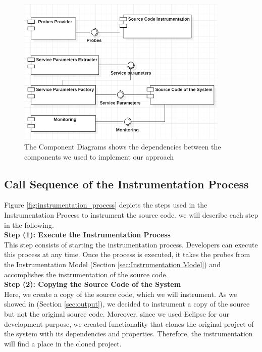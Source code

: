 \begin{figure}[h]
\centering
\includegraphics[width=0.9\textwidth]{figures/architecture}
\caption{The Component Diagrams shows the dependencies between the components we used to implement our approach}
\label{fig:architecture}
\end{figure}

\subsection{Call Sequence of the Instrumentation Process}
\label{sec:Call Sequence of the Instrumentation Process}
Figure \ref{fig:instrumentation_process} depicts the steps used in the Instrumentation Process to instrument the source code. we will describe each step in the following. \\

\textbf{Step (1): Execute the Instrumentation Process}\\
This step consists of starting the instrumentation process. Developers can execute this process at any time. Once the process is executed, it takes the probes from the Instrumentation Model (Section \ref{sec:Instrumentation Model}) and accomplishes the instrumentation of the source code. \\

\textbf{Step (2): Copying the Source Code of the System}\\
Here, we create a copy of the source code, which we will instrument. As we showed in (Section \ref{sec:output}), we decided to instrument a copy of the source but not the original source code. Moreover, since we used Eclipse for our development purpose, we created functionality that clones the original project of the system with its dependencies and properties. Therefore, the instrumentation will find a place in the cloned project.  \\

